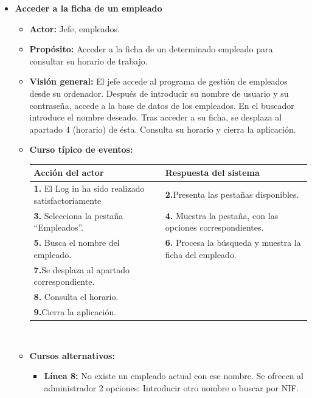 \documentclass[spanish,a4paper,12pt]{report}		%
\begin{document}
\begin{itemize}
	\item \textbf{Acceder a la ficha de un empleado}		%
			\begin{itemize}
			\item \textbf{Actor:} Jefe, empleados.
			\item \textbf{Propósito: } Acceder a la ficha de un determinado empleado para consultar su horario de trabajo.
			\item \textbf{Visión general:} El jefe accede al programa de gestión de empleados desde su ordenador. Después de introducir su nombre de usuario y su contraseña, accede a la base de datos de los empleados. En el buscador introduce el nombre deseado. Tras acceder a su ficha, se desplaza al apartado 4 (horario) de ésta. Consulta su horario y cierra la aplicación. 
			\item \textbf{Curso típico de eventos:} 	\\
				\begin{tabular}{|p{6cm}||p{6cm}|}
				\hline
				\textbf{Acción del actor} & \textbf{Respuesta del sistema} \\ \hline \hline
				\textbf{1.} El Log in ha sido realizado satisfactoriamente & \textbf{2.}Presenta las pestañas disponibles.\\ \hline 
				\textbf{3.} Selecciona la pestaña “Empleados”. & \textbf{4.} Muestra la pestaña, con las opciones correspondientes. \\ \hline
				\textbf{5.} Busca el nombre del empleado.	& \textbf{6.} Procesa la búsqueda y muestra la ficha del empleado. \\ \hline
				\textbf{7.}Se desplaza al apartado correspondiente.  & \textbf{} \\ \hline
				 \textbf{8.} Consulta el horario.  & \textbf{}\\ \hline
				\textbf{9.}Cierra la aplicación. & \textbf{} \\ \hline
			\end{tabular}
			\\
			\item \textbf{Cursos alternativos:} 
			\begin{itemize}
			\item  \textbf{Línea 8:} No existe un empleado actual con ese nombre. Se ofrecen al administrador 2 opciones: Introducir otro nombre o buscar por NIF.
			\end {itemize}
		\end{itemize}%



\end{itemize}
\end{document}
